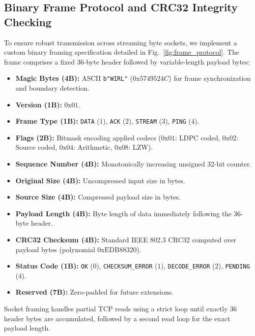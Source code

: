 \documentclass[conference]{IEEEtran}
\begin{document}
\subsection{Binary Frame Protocol and CRC32 Integrity Checking}
To ensure robust transmission across streaming byte sockets, we implement a custom binary framing specification detailed in Fig.~\ref{fig:frame_protocol}. The frame comprises a fixed 36-byte header followed by variable-length payload bytes:
\begin{itemize}
    \item \textbf{Magic Bytes (4B):} ASCII \texttt{b"WIRL"} ($0\text{x}5749524C$) for frame synchronization and boundary detection.
    \item \textbf{Version (1B):} $0\text{x}01$.
    \item \textbf{Frame Type (1B):} \texttt{DATA} ($1$), \texttt{ACK} ($2$), \texttt{STREAM} ($3$), \texttt{PING} ($4$).
    \item \textbf{Flags (2B):} Bitmask encoding applied codecs ($0\text{x}01$: LDPC coded, $0\text{x}02$: Source coded, $0\text{x}04$: Arithmetic, $0\text{x}08$: LZW).
    \item \textbf{Sequence Number (4B):} Monotonically increasing unsigned 32-bit counter.
    \item \textbf{Original Size (4B):} Uncompressed input size in bytes.
    \item \textbf{Source Size (4B):} Compressed payload size in bytes.
    \item \textbf{Payload Length (4B):} Byte length of data immediately following the 36-byte header.
    \item \textbf{CRC32 Checksum (4B):} Standard IEEE 802.3 CRC32 computed over payload bytes (polynomial $0\text{xEDB88320}$).
    \item \textbf{Status Code (1B):} \texttt{OK} ($0$), \texttt{CHECKSUM\_ERROR} ($1$), \texttt{DECODE\_ERROR} ($2$), \texttt{PENDING} ($4$).
    \item \textbf{Reserved (7B):} Zero-padded for future extensions.
\end{itemize}

Socket framing handles partial TCP reads using a strict loop until exactly 36 header bytes are accumulated, followed by a second read loop for the exact payload length.
\end{document}
